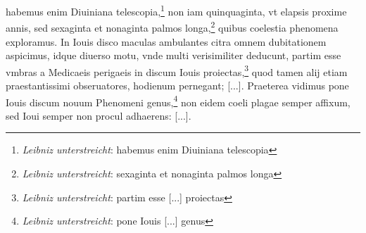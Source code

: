 \pend \pstart [p.~229] [...] habemus enim Diuiniana telescopia\protect{},\footnote{\textit{Leibniz unterstreicht}: habemus enim Diuiniana telescopia} non iam quinquaginta, vt elapsis proxime  annis, sed sexaginta et nonaginta palmos longa,\footnote{\textit{Leibniz unterstreicht}: sexaginta et nonaginta palmos longa} quibus coelestia phenomena exploramus. In Iouis\protect{} disco maculas ambulantes citra omnem dubitationem aspicimus, idque diuerso motu, vnde multi verisimiliter deducunt, partim esse  vmbras a Medicaeis perigaeis in discum Iouis\protect{} proiectas,\footnote{\textit{Leibniz unterstreicht}: partim esse [...] proiectas}  quod tamen alij etiam praestantissimi obseruatores, hodienum pernegant; [...]. \pend \pstart  Praeterea vidimus pone Iouis\protect{} discum nouum Phenomeni genus,\footnote{\textit{Leibniz unterstreicht}: pone Iouis [...] genus} non eidem coeli plagae semper affixum, sed Ioui\protect{} semper non procul adhaerens: [...].